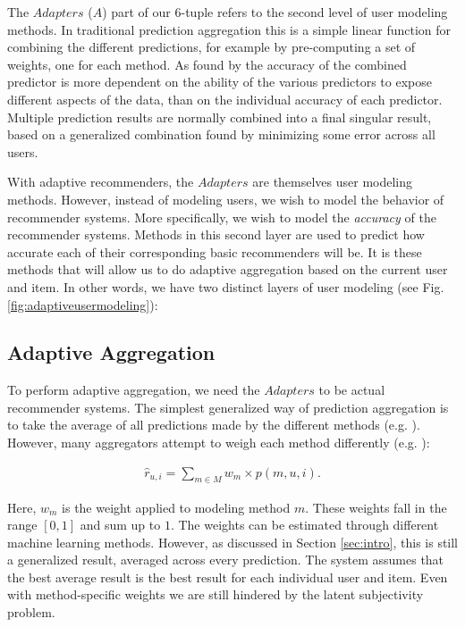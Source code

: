 The $Adapters$ ($A$) part of our 6-tuple refers to the second level of user modeling methods.
In traditional prediction aggregation this is a simple linear function for combining the different predictions,
for example by pre-computing a set of weights, one for each method.
As found by \cite[p6]{Bell2007} the accuracy of the combined predictor is more dependent on the 
ability of the various predictors to expose different aspects of the data, than on 
the individual accuracy of each predictor.
Multiple prediction results are normally combined into a final singular result,
based on a generalized combination found by minimizing some error across all users.

With adaptive recommenders, the $Adapters$ are themselves user modeling methods.
However, instead of modeling users, we wish to model the behavior of recommender systems.
More specifically, we wish to model the \emph{accuracy} of the recommender systems.
Methods in this second layer are used to predict how accurate each of their corresponding basic recommenders will be.
It is these methods that will allow us to do adaptive aggregation based on the current user and item.
In other words, we have two distinct layers of user modeling 
(see Fig. \ref{fig:adaptiveusermodeling}):



\subsection{Adaptive Aggregation}

To perform adaptive aggregation, we need the $Adapters$ to be actual recommender systems.
The simplest generalized way of prediction aggregation is to take the average of all predictions made
by the different methods (e.g. \cite[p3]{Aslam2001}).
However, many aggregators attempt to weigh each method differently (e.g. \cite{Claypool1999}):

\begin{eqnarray*}
  \hat{r}_{u,i} = \sum_{m \in M} w_{m} \times p(m,u,i).
\end{eqnarray*}

Here, $w_m$ is the weight applied to modeling method $m$. 
These weights fall in the range $[0,1]$ and sum up to $1$.
The weights can be estimated through different machine learning methods.
However, as discussed in Section \ref{sec:intro},
this is still a generalized result, averaged across every prediction.
The system assumes that the best average result is the best result for each individual user and item.
Even with method-specific weights we are still hindered by the latent subjectivity problem.

